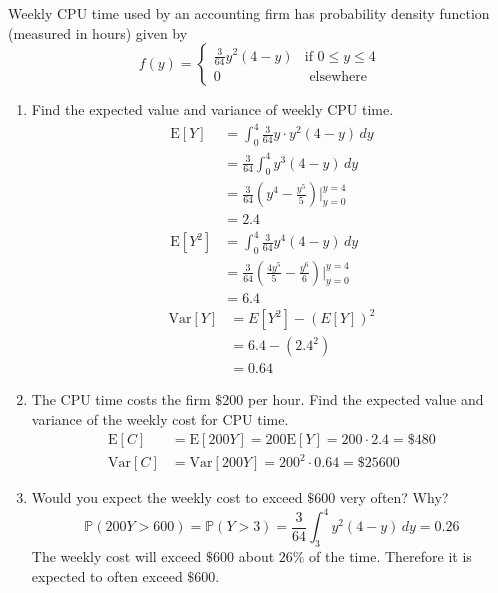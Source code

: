 \documentclass[12pt]{article}
\newcommand{\ques}[1]{\noindent {\bf Question #1: }}
\newcommand{\prob}[1]{\mathbb{P}(#1)}
\begin{document}
\ques{4.32} Weekly CPU time used by an accounting firm has probability density function (measured in hours) given by 
$$ f(y) = \begin{cases} \frac{3}{64}y^2(4-y) &\text{if } 0 \leq y \leq 4 \\ 0 &\text{ elsewhere } \end{cases} $$ 
\begin{enumerate} 
\item Find the expected value and variance of weekly CPU time. 
$$ \begin{aligned} \text{E}[Y] &= \int_0^4 \frac{3}{64}y \cdot y^2 (4-y) \, dy \\ &= \frac{3}{64} \int_0^4 y^3(4-y) \, dy \\ &= \frac{3}{64}\left( y^4 - \frac{y^5}{5} \right)\Big|_{y=0}^{y=4} \\ &= 2.4 \\ 
\text{E}[Y^2] &= \int_0^4 \frac{3}{64} y^4(4-y) \, dy \\ &= \frac{3}{64} \left( \frac{4y^5}{5} - \frac{y^6}{6} \right)\Big|_{y=0}^{y=4} \\ &= 6.4 \end{aligned} $$ 
$$ \begin{aligned} \text{Var}[Y] &= E[Y^2] - (E[Y])^2 \\ &= 6.4 - (2.4^2) \\ &= 0.64 \end{aligned} $$ 
\item The CPU time costs the firm $\$200$ per hour. Find the expected value and variance of the weekly cost for CPU time. 
$$ \begin{aligned} \text{E}[C] &= \text{E}[200Y] = 200\text{E}[Y] = 200 \cdot 2.4 = \$480 \\ \text{Var}[C] &= \text{Var}[200Y] = 200^2 \cdot 0.64 = \$25600 \end{aligned} $$ 
\item Would you expect the weekly cost to exceed $\$600$ very often? Why? 
$$ \prob{200Y > 600} = \prob{Y > 3} = \frac{3}{64} \int_3^4 y^2(4-y) \, dy = 0.26 $$ 
The weekly cost will exceed $\$600$ about $26\%$ of the time. Therefore it is expected to often exceed $\$600$. 

\end{enumerate} 
\end{document}
